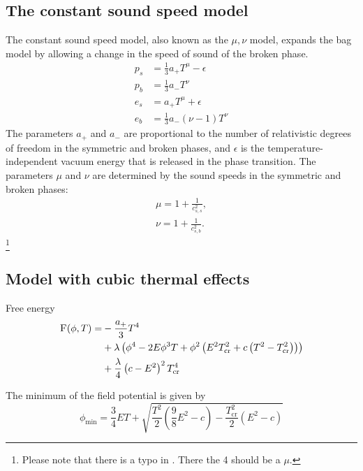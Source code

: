 \subsection{The constant sound speed model}
The constant sound speed model, also known as the $\mu, \nu$ model, expands the bag model by allowing a change in the speed of sound of the broken phase.
\cites[eq. 15]{giese_2021}[eq. 38]{giese_2020}
\begin{align}
p_s &= \frac{1}{3} a_+ T^\mu - \epsilon \\
p_b &= \frac{1}{3} a_- T^\nu \\
e_s &= a_+ T^\mu + \epsilon \\
e_b &= \frac{1}{3} a_- (\nu - 1) T^\nu
\end{align}
The parameters $a_+$ and $a_-$ are proportional to the number of relativistic degrees of freedom in the symmetric and broken phases, and $\epsilon$ is the temperature-independent vacuum energy that is released in the phase transition.
The parameters $\mu$ and $\nu$ are determined by the sound speeds in the symmetric and broken phases:
\cites[eq. 16]{giese_2021}[eq. 39]{giese_2020}
\begin{align}
\mu = 1 + \frac{1}{c_{s,s}^2}, \\
\nu = 1 + \frac{1}{c_{s,b}^2}.
\end{align}
\footnote{Please note that there is a typo in \cite[eq. 15]{giese_2021}. There the 4 should be a $\mu$.}

\subsection{Model with cubic thermal effects}
Free energy
\cite[eq. 45]{giese_2020}
\begin{align}
\begin{split}
\textsc{F}(\phi, T) =
&- \frac{a_+}{3} T^4 \\
&+ \lambda \left( \phi^4 - 2E\phi^3 T + \phi^2 \left( E^2 T_\text{cr}^2 + c \left( T^2 - T_\text{cr}^2 \right) \right) \right) \\
&+ \frac{\lambda}{4} \left( c - E^2 \right)^2 T_\text{cr}^4
\end{split}
\end{align}

The minimum of the field potential is given by
\cite[eq. 46]{giese_2020}
\begin{equation}
\phi_\text{min} = \frac{3}{4} ET + \sqrt{\frac{T^2}{2}(\frac{9}{8}E^2 - c) - \frac{T_\text{cr}^2}{2} (E^2 - c)}
\end{equation}

